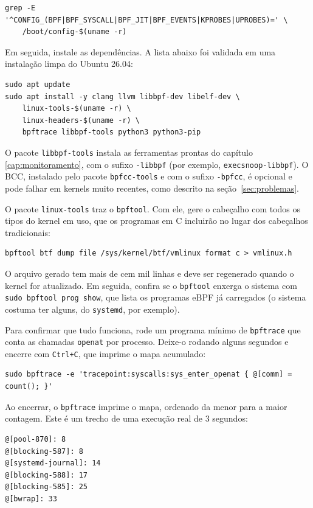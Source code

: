 \begin{lstlisting}
grep -E '^CONFIG_(BPF|BPF_SYSCALL|BPF_JIT|BPF_EVENTS|KPROBES|UPROBES)=' \
    /boot/config-$(uname -r)
\end{lstlisting}

Em seguida, instale as dependências. A lista abaixo foi validada em uma instalação limpa do Ubuntu 26.04:

\begin{lstlisting}
sudo apt update
sudo apt install -y clang llvm libbpf-dev libelf-dev \
    linux-tools-$(uname -r) \
    linux-headers-$(uname -r) \
    bpftrace libbpf-tools python3 python3-pip
\end{lstlisting}

O pacote \texttt{libbpf-tools} instala as ferramentas prontas do capítulo \ref{cap:monitoramento}, com o sufixo \texttt{-libbpf} (por exemplo, \texttt{execsnoop-libbpf}). O BCC, instalado pelo pacote \texttt{bpfcc-tools} e com o sufixo \texttt{-bpfcc}, é opcional e pode falhar em kernels muito recentes, como descrito na seção~\ref{sec:problemas}.

O pacote \texttt{linux-tools} traz o \texttt{bpftool}. Com ele, gere o cabeçalho com todos os tipos do kernel em uso, que os programas em C incluirão no lugar dos cabeçalhos tradicionais:

\begin{lstlisting}
bpftool btf dump file /sys/kernel/btf/vmlinux format c > vmlinux.h
\end{lstlisting}

O arquivo gerado tem mais de cem mil linhas e deve ser regenerado quando o kernel for atualizado. Em seguida, confira se o \texttt{bpftool} enxerga o sistema com \texttt{sudo bpftool prog show}, que lista os programas eBPF já carregados (o sistema costuma ter alguns, do \texttt{systemd}, por exemplo).

Para confirmar que tudo funciona, rode um programa mínimo de \texttt{bpftrace} que conta as chamadas \texttt{openat} por processo. Deixe-o rodando alguns segundos e encerre com \texttt{Ctrl+C}, que imprime o mapa acumulado:

\begin{lstlisting}
sudo bpftrace -e 'tracepoint:syscalls:sys_enter_openat { @[comm] = count(); }'
\end{lstlisting}
Ao encerrar, o \texttt{bpftrace} imprime o mapa, ordenado da menor para a maior contagem. Este é um trecho de uma execução real de 3 segundos:

\begin{lstlisting}
@[pool-870]: 8
@[blocking-587]: 8
@[systemd-journal]: 14
@[blocking-588]: 17
@[blocking-585]: 25
@[bwrap]: 33
\end{lstlisting}

